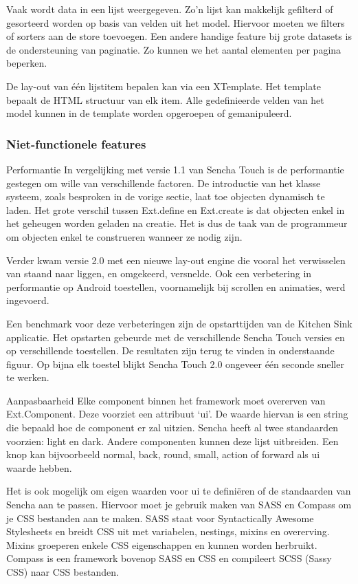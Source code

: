 Vaak wordt data in een lijst weergegeven.  Zo'n lijst kan makkelijk gefilterd of gesorteerd worden op basis van velden uit het model.  Hiervoor moeten we filters of sorters aan de store toevoegen.  Een andere handige feature bij grote datasets is de ondersteuning van paginatie.  Zo kunnen we het aantal elementen per pagina beperken.  

De lay-out van één lijstitem bepalen kan via een XTemplate.  Het template bepaalt de HTML structuur van elk item.  Alle gedefinieerde velden van het model kunnen in de template worden opgeroepen of gemanipuleerd.

\subsubsection{Niet-functionele features}
Performantie
In vergelijking met versie 1.1 van Sencha Touch is de performantie gestegen om wille van verschillende factoren.  De introductie van het klasse systeem,  zoals besproken in de vorige sectie,  laat toe objecten dynamisch te laden.  Het grote verschil tussen Ext.define en Ext.create is dat objecten enkel in het geheugen worden geladen na creatie.  Het is dus de taak van de programmeur om objecten enkel te construeren wanneer ze nodig zijn.

Verder kwam versie 2.0 met een nieuwe lay-out engine die vooral het verwisselen van staand naar liggen,  en omgekeerd,  versnelde.  Ook een verbetering in performantie op Android toestellen,  voornamelijk bij scrollen en animaties,  werd ingevoerd.

Een benchmark voor deze verbeteringen zijn de opstarttijden van de Kitchen Sink applicatie.  Het opstarten gebeurde met de verschillende Sencha Touch versies en op verschillende toestellen.  De resultaten zijn terug te vinden in onderstaande figuur.  Op bijna elk toestel blijkt Sencha Touch 2.0 ongeveer één seconde sneller te werken.

Aanpasbaarheid
Elke component binnen het framework moet overerven van Ext.Component.  Deze voorziet een attribuut ‘ui'.  De waarde hiervan is een string die bepaald hoe de component er zal uitzien.  Sencha heeft al twee standaarden voorzien:  light en dark.  Andere componenten kunnen deze lijst uitbreiden.  Een knop kan bijvoorbeeld normal,  back,  round,  small,  action of forward als ui waarde hebben.

Het is ook mogelijk om eigen waarden voor ui te definiëren of de standaarden van Sencha aan te passen.  Hiervoor moet je gebruik maken van SASS en Compass om je CSS bestanden aan te maken.  SASS staat voor Syntactically Awesome Stylesheets en breidt CSS uit met variabelen,  nestings,  mixins en overerving.  Mixins groeperen enkele CSS eigenschappen en kunnen worden herbruikt.  Compass is een framework bovenop SASS en CSS en compileert SCSS (Sassy CSS) naar CSS bestanden.        

